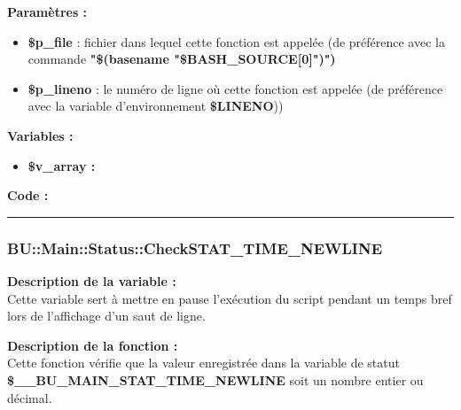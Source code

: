 \documentclass[a4paper,10pt]{article}
\begin{document}
\begin{justify}
    \textbf{Paramètres :}

    \begin{itemize}
        \item \color{orange}\textbf{\$p\_file}\color{white} : fichier dans lequel cette fonction est appelée (de préférence avec la commande \textbf{"\$(\color{gray}basename \color{white}"\color{orange}\$BASH\_SOURCE[0]\color{white}")")}\\

        \item \color{orange}\textbf{\$p\_lineno}\color{white} : le numéro de ligne où cette fonction est appelée (de préférence avec la variable d'environnement \textbf{\color{orange}\$LINENO}))
    \end{itemize}
\end{justify}

\begin{justify}
    \textbf{Variables :}

    \begin{itemize}
        \item \textbf{\color{orange}\$v\_array\color{white} :}
    \end{itemize}
\end{justify}

\begin{justify}
    \textbf{Code :}
\end{justify}



\color{blue}\par\noindent\rule{\textwidth}{0.4pt}\color{white}

\color{blue}
\subsubsection{\color{mauve}BU::Main::Status::CheckSTAT\_TIME\_NEWLINE}\color{white}

\begin{justify}
    \textbf{Description de la variable :}\\
    Cette variable sert à mettre en pause l'exécution du script pendant un temps bref lors de l'affichage d'un saut de ligne.
\end{justify}

\begin{justify}
    \textbf{Description de la fonction :}\\
    Cette fonction vérifie que la valeur enregistrée dans la variable de statut \textbf{\color{orange}\$\_\_BU\_MAIN\_STAT\_TIME\_NEWLINE} soit un nombre entier ou décimal.
\end{justify}
\end{document}
